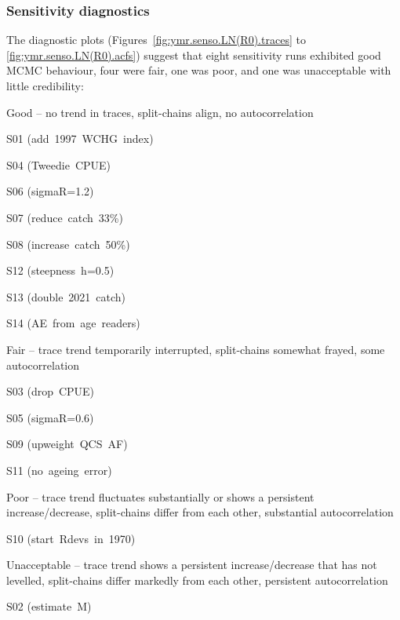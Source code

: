 \documentclass[11pt]{book}
\begin{document}
\subsubsection{Sensitivity diagnostics}

The diagnostic plots (Figures~\ref{fig:ymr.senso.LN(R0).traces} to \ref{fig:ymr.senso.LN(R0).acfs}) suggest that eight sensitivity runs exhibited good MCMC behaviour, four were fair, one was poor, and one was unacceptable with little credibility:
\vspace{-0.5\baselineskip}%
\begin{itemize_csas}
  \item Good -- no trend in traces, split-chains align, no autocorrelation
  \begin{itemize_csas}
    \item S01 (add~1997~WCHG~index)
    \item S04 (Tweedie~CPUE)
    \item S06 (sigmaR=1.2)
    \item S07 (reduce~catch~33\%)
    \item S08 (increase~catch~50\%)
    \item S12 (steepness~h=0.5)
    \item S13 (double~2021~catch)
    \item S14 (AE~from~age~readers)
  \end{itemize_csas}
  \item Fair -- trace trend temporarily interrupted, split-chains somewhat frayed, some autocorrelation
  \begin{itemize_csas}
    \item S03 (drop~CPUE)
    \item S05 (sigmaR=0.6)
    \item S09 (upweight~QCS~AF)
    \item S11 (no~ageing~error)
  \end{itemize_csas}
  \item Poor -- trace trend fluctuates substantially or shows a persistent increase/decrease, split-chains differ from each other, substantial autocorrelation
  \begin{itemize_csas}
    \item S10 (start~Rdevs~in~1970)
  \end{itemize_csas}
  \item Unacceptable -- trace trend shows a persistent increase/decrease that has not levelled, split-chains differ markedly from each other, persistent autocorrelation
  \begin{itemize_csas}
    \item S02 (estimate~M)
  \end{itemize_csas}
 \end{itemize_csas}
\end{document}
